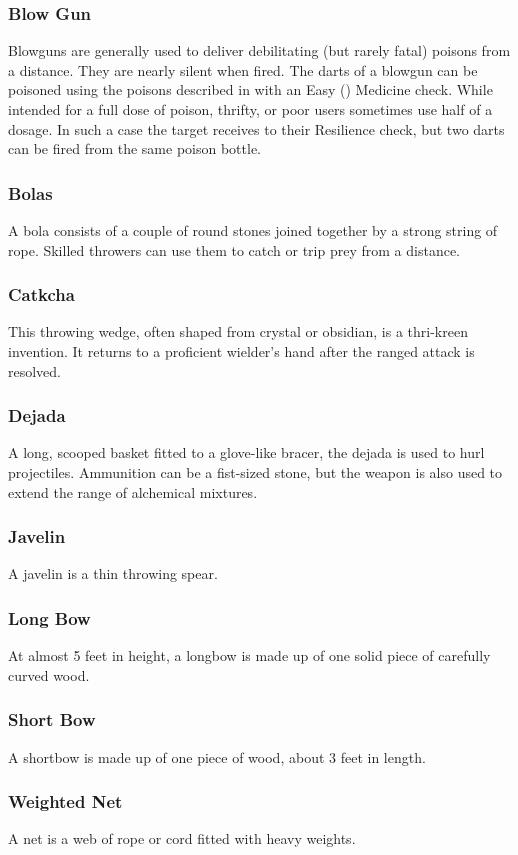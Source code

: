 \begin{multicols}{2}

\subsubsection{Blow Gun}
\label{itmrng:blowgun}
Blowguns are generally used to deliver debilitating (but rarely fatal) poisons from a distance. They are nearly silent when fired. The darts of a
blowgun can be poisoned using the poisons described in  with an Easy (\difficulty) Medicine check. While intended for a full
dose of poison, thrifty, or poor users sometimes use half of a dosage. In such a case the target receives \boost\boost\boost to their Resilience
check, but two darts can be fired from the same poison bottle.

\subsubsection{Bolas}
\label{itmrng:bolas}
A bola consists of a couple of round stones joined together by a strong string of rope. Skilled throwers can use them to catch or trip prey from a distance.

\subsubsection{Catkcha}
\label{itmrng:catkcha}
This throwing wedge, often shaped from crystal or obsidian, is a thri-kreen invention. It returns to a proficient wielder’s hand after the ranged attack is resolved.

\subsubsection{Dejada}
\label{itmrng:dejada}
A long, scooped basket fitted to a glove-like bracer, the dejada is used to hurl projectiles. Ammunition can be a fist-sized stone, but the weapon is also used to extend the range of alchemical mixtures.

\subsubsection{Javelin}
\label{itmrng:javelin}
A javelin is a thin throwing spear.

\subsubsection{Long Bow}
\label{itmrng:longbow}
At almost 5 feet in height, a longbow is made up of one solid piece of carefully curved wood.

\subsubsection{Short Bow}
\label{itmrng:shortbow}
A shortbow is made up of one piece of wood, about 3 feet in length.

\subsubsection{Weighted Net}
\label{itmrng:weighted_net}
A net is a web of rope or cord fitted with heavy weights.

\end{multicols}
